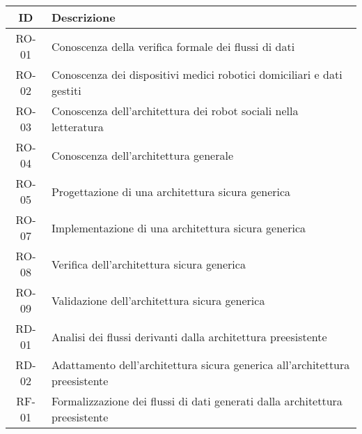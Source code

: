\begin{tabularx}{\textwidth}{|c|X|}
    \hline
    \textbf{ID} & \textbf{Descrizione} \\
    \hline \hline
    RO-01 & Conoscenza della verifica formale dei flussi di dati \\
    \hdashline
    RO-02 & Conoscenza dei dispositivi medici robotici domiciliari e dati gestiti \\
    \hdashline
    RO-03 & Conoscenza dell'architettura dei robot sociali nella letteratura \\
    \hdashline
    RO-04 & Conoscenza dell'architettura generale \\
    \hdashline
    RO-05 & Progettazione di una architettura sicura generica \\
    \hdashline
    RO-07 & Implementazione di una architettura sicura generica \\
    \hdashline
    RO-08 & Verifica dell'architettura sicura generica \\
    \hdashline
    RO-09 & Validazione dell'architettura sicura generica \\
    \hline
    RD-01 & Analisi dei flussi derivanti dalla architettura preesistente \\
    \hdashline
    RD-02 & Adattamento dell'architettura sicura generica all'architettura preesistente \\
    \hline
    RF-01 & Formalizzazione dei flussi di dati generati dalla architettura preesistente \\
    \hline
\end{tabularx}
\newpage